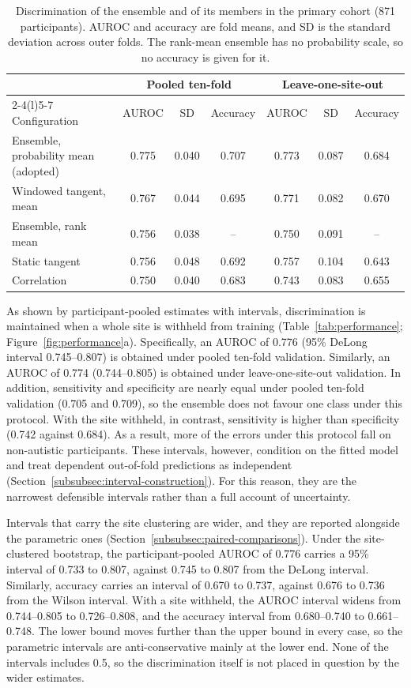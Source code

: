\begin{table}[pos=htb]
\centering
\caption{Discrimination of the ensemble and of its members in the primary cohort
(871 participants). AUROC and accuracy are fold means, and SD is the standard deviation
across outer folds. The rank-mean ensemble has no probability scale, so no accuracy is
given for it.}
\label{tab:configurations}
\small
\begin{tabular}{@{}lcccccc@{}}
\toprule
 & \multicolumn{3}{c}{Pooled ten-fold} & \multicolumn{3}{c}{Leave-one-site-out} \\
\cmidrule(lr){2-4}\cmidrule(l){5-7}
Configuration & AUROC & SD & Accuracy & AUROC & SD & Accuracy \\
\midrule
Ensemble, probability mean (adopted) & 0.775 & 0.040 & 0.707 & 0.773 & 0.087 & 0.684 \\
Windowed tangent, mean & 0.767 & 0.044 & 0.695 & 0.771 & 0.082 & 0.670 \\
Ensemble, rank mean & 0.756 & 0.038 & -- & 0.750 & 0.091 & -- \\
Static tangent & 0.756 & 0.048 & 0.692 & 0.757 & 0.104 & 0.643 \\
Correlation & 0.750 & 0.040 & 0.683 & 0.743 & 0.083 & 0.655 \\
\bottomrule
\end{tabular}
\end{table}

As shown by participant-pooled estimates with intervals, discrimination is maintained when
a whole site is withheld from training (Table~\ref{tab:performance};
Figure~\ref{fig:performance}a). Specifically, an AUROC of 0.776 (95\% DeLong interval
0.745--0.807) is obtained under pooled ten-fold validation. Similarly, an AUROC of 0.774
(0.744--0.805) is obtained under leave-one-site-out validation. In addition, sensitivity
and specificity are nearly equal under pooled ten-fold validation (0.705 and 0.709), so the
ensemble does not favour one class under this protocol. With the site withheld, in
contrast, sensitivity is higher than specificity (0.742 against 0.684). As a result, more of
the errors under this protocol fall on non-autistic participants. These intervals, however,
condition on the fitted model and treat
dependent out-of-fold predictions as independent (Section~\ref{subsubsec:interval-construction}). For this
reason, they are the narrowest defensible intervals rather than a full account of
uncertainty.

Intervals that carry the site clustering are wider, and they are reported alongside the
parametric ones (Section~\ref{subsubsec:paired-comparisons}). Under the site-clustered
bootstrap, the participant-pooled AUROC of 0.776 carries a 95\% interval of 0.733 to 0.807,
against 0.745 to 0.807 from the DeLong interval. Similarly, accuracy carries an interval of
0.670 to 0.737, against 0.676 to 0.736 from the Wilson interval. With a site withheld, the
AUROC interval widens from 0.744--0.805 to 0.726--0.808, and the accuracy interval from
0.680--0.740 to 0.661--0.748. The lower bound moves further than the upper bound in every
case, so the parametric intervals are anti-conservative mainly at the lower end. None of the
intervals includes 0.5, so the discrimination itself is not placed in question by the wider
estimates.

